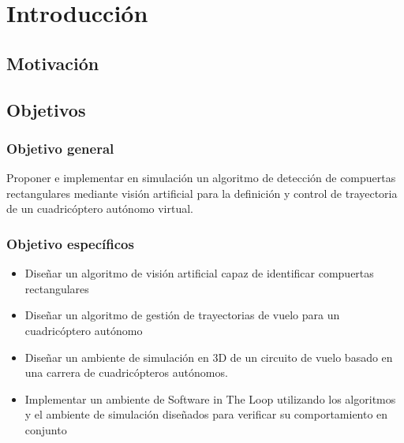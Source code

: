 \chapter{Introducción}

\section{Motivación}



\section{Objetivos}
\subsection{Objetivo general}

Proponer e implementar en simulación un algoritmo de detección de compuertas rectangulares mediante visión artificial para la definición y control de trayectoria de un cuadricóptero autónomo virtual.   

\subsection{Objetivo específicos}

\begin{itemize}
    \item Diseñar un algoritmo de visión artificial capaz de identificar compuertas rectangulares 
    \item Diseñar un algoritmo de gestión de trayectorias de vuelo para un cuadricóptero autónomo 
    \item Diseñar un ambiente de simulación en 3D de un circuito de vuelo basado en una carrera de cuadricópteros autónomos. 
    \item Implementar un ambiente de Software in The Loop utilizando los algoritmos y el ambiente de simulación diseñados para verificar su comportamiento en conjunto 
\end{itemize}


